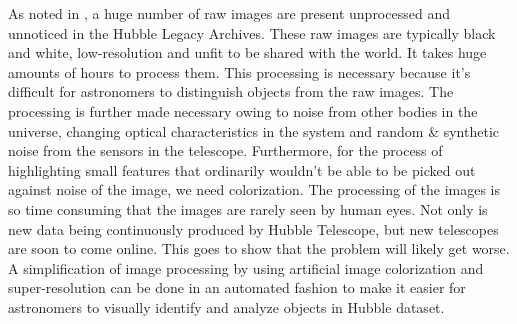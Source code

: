 \documentclass{article} %
\begin{document}
As noted in \citep{Gao2019astronomical}, a huge number of raw images are present unprocessed and unnoticed in the Hubble Legacy Archives. These raw images are typically black and white, low-resolution and unfit to be shared with the world. It takes huge amounts of hours to process them. This processing is necessary because it's difficult for astronomers to distinguish objects from the raw images. The processing is further made necessary owing to noise from other bodies in the universe, changing optical characteristics in the system and random \& synthetic noise from the sensors in the telescope. Furthermore, for the process of highlighting small features that ordinarily wouldn't be able to be picked out against noise of the image, we need colorization. The processing of the images is so time consuming that the images are rarely seen by human eyes. Not only is new data being continuously produced by Hubble Telescope, but new telescopes are soon to come online. This goes to show that the problem will likely get worse. A simplification of image processing by using artificial image colorization and super-resolution can be done in an automated fashion to make it easier for astronomers to visually identify and analyze objects in Hubble dataset.
\end{document}
